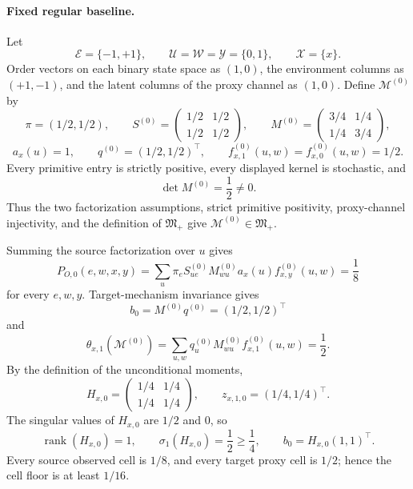 \paragraph{Fixed regular baseline.}
Let
\[
\mathcal E=\{-1,+1\},\qquad
\mathcal U=\mathcal W=\mathcal Y=\{0,1\},\qquad
\mathcal X=\{x\}.
\]
Order vectors on each binary state space as \((1,0)\), the environment columns as \((+1,-1)\), and the latent columns of the proxy channel as \((1,0)\). Define \(\mathcal M^{(0)}\) by
\[
\pi=(1/2,1/2),\qquad
S^{(0)}=
\begin{pmatrix}1/2&1/2\\1/2&1/2\end{pmatrix},\qquad
M^{(0)}=
\begin{pmatrix}3/4&1/4\\1/4&3/4\end{pmatrix},
\]
\[
a_x(u)=1,\qquad q^{(0)}=(1/2,1/2)^{\top},\qquad
f^{(0)}_{x,1}(u,w)=f^{(0)}_{x,0}(u,w)=1/2.
\]
Every primitive entry is strictly positive, every displayed kernel is stochastic, and
\[
\det M^{(0)}=\frac12\ne0.
\]
Thus the two factorization assumptions, strict primitive positivity, proxy-channel injectivity, and the definition of \(\mathfrak M_{+}\) give
\(\mathcal M^{(0)}\in\mathfrak M_{+}\).

Summing the source factorization over \(u\) gives
\[
P_{O,0}(e,w,x,y)
=\sum_u\pi_eS^{(0)}_{ue}M^{(0)}_{wu}a_x(u)f^{(0)}_{x,y}(u,w)
=\frac18
\]
for every \(e,w,y\). Target-mechanism invariance gives
\[
b_0=M^{(0)}q^{(0)}=(1/2,1/2)^{\top}
\]
and
\[
\theta_{x,1}(\mathcal M^{(0)})
=\sum_{u,w}q^{(0)}_uM^{(0)}_{wu}f^{(0)}_{x,1}(u,w)
=\frac12.
\]
By the definition of the unconditional moments,
\[
H_{x,0}=
\begin{pmatrix}1/4&1/4\\1/4&1/4\end{pmatrix},
\qquad
z_{x,1,0}=(1/4,1/4)^{\top}.
\]
The singular values of \(H_{x,0}\) are \(1/2\) and \(0\), so
\[
\operatorname{rank}(H_{x,0})=1,\qquad
\sigma_1(H_{x,0})=\frac12\ge\frac14,\qquad
b_0=H_{x,0}(1,1)^{\top}.
\]
Every source observed cell is \(1/8\), and every target proxy cell is \(1/2\); hence the cell floor is at least \(1/16\).

